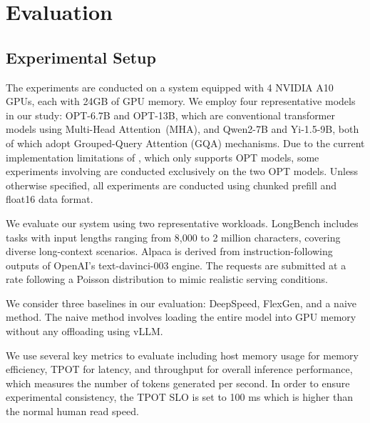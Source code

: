 \section{Evaluation}


\subsection{Experimental Setup}
\label{sec:expsetup}


The experiments are conducted on a system equipped with 4 NVIDIA A10 GPUs, each with 24GB of GPU memory.
We employ four representative models in our study: OPT-6.7B and OPT-13B, which are conventional transformer models using Multi-Head Attention~(MHA), 
and Qwen2-7B and Yi-1.5-9B, both of which adopt Grouped-Query Attention (GQA) mechanisms.
Due to the current implementation limitations of \flexgen, which only supports OPT models, 
some experiments involving \flexgen are conducted exclusively on the two OPT models.
%
Unless otherwise specified, all experiments are conducted using chunked prefill and float16 data format.

%
We evaluate our system using two representative workloads. 
LongBench includes tasks with input lengths ranging from 8,000 to 2 million characters, covering diverse long-context scenarios. 
Alpaca is derived from instruction-following outputs of OpenAI's text-davinci-003 engine. 
The requests are submitted at a rate following a Poisson distribution to mimic realistic serving conditions. 

We consider three baselines in our evaluation: DeepSpeed, FlexGen, and a naive method.
The naive method involves loading the entire model into GPU memory without any offloading using vLLM. 

%
We use several key metrics to evaluate including host memory usage for memory efficiency, 
%
TPOT for latency, and throughput for overall inference performance, which measures the number of tokens generated per second.
In order to ensure experimental consistency, the TPOT SLO is set to 100 ms which is higher than the normal human read
speed.

